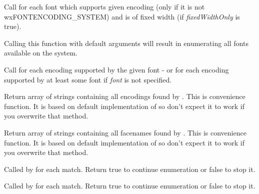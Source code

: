 \label{wxfontenumeratorenumeratefacenames}


Call  for each font which
supports given encoding (only if it is not wxFONTENCODING\_SYSTEM) and is of
fixed width (if {\it fixedWidthOnly} is true).

Calling this function with default arguments will result in enumerating all
fonts available on the system.

\label{wxfontenumeratorenumerateencodings}


Call  for each
encoding supported by the given font - or for each encoding supported by at
least some font if {\it font} is not specified.


\label{wxfontenumeratorgetencodings}


Return array of strings containing all encodings found by 
. This is convenience function. It is 
based on default implementation of  so don't expect
it to work if you overwrite that method.

\label{wxfontenumeratorgetfacenames}


Return array of strings containing all facenames found by 
. This is convenience function. It is 
based on default implementation of  so don't expect
it to work if you overwrite that method.


\label{wxfontenumeratoronfacename}


Called by  for
each match. Return true to continue enumeration or false to stop it.

\label{wxfontenumeratoronfontencoding}


Called by  for
each match. Return true to continue enumeration or false to stop it.

